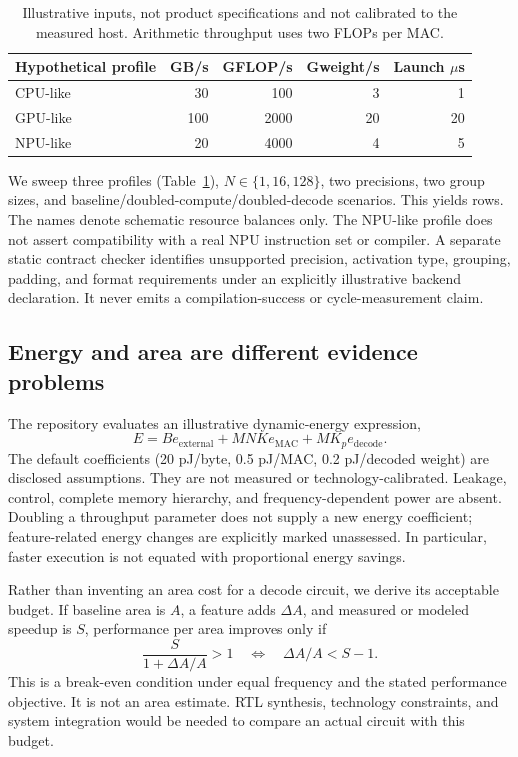 \documentclass[11pt]{article}
\begin{document}
\begin{table}[t]
\centering
\begin{tabular}{lrrrr}
\toprule
Hypothetical profile & GB/s & GFLOP/s & Gweight/s & Launch $\mu$s\\
\midrule
CPU-like &30&100&3&1\\
GPU-like &100&2000&20&20\\
NPU-like &20&4000&4&5\\
\bottomrule
\end{tabular}
\caption{Illustrative inputs, not product specifications and not calibrated to the
measured host. Arithmetic throughput uses two FLOPs per MAC.}
\label{tab:profiles}
\end{table}

We sweep three profiles (Table~\ref{tab:profiles}), $N\in\{1,16,128\}$, two
precisions, two group sizes, and baseline/doubled-compute/doubled-decode
scenarios. This yields \ScenarioCount{} rows. The names denote schematic resource
balances only. The NPU-like profile does not assert compatibility with a real NPU
instruction set or compiler. A separate static contract checker identifies
unsupported precision, activation type, grouping, padding, and format requirements
under an explicitly illustrative backend declaration. It never emits a
compilation-success or cycle-measurement claim.

\subsection{Energy and area are different evidence problems}
The repository evaluates an illustrative dynamic-energy expression,
\begin{equation}
E=B e_{\mathrm{external}}+MNK e_{\mathrm{MAC}}+MK_p e_{\mathrm{decode}}.
\end{equation}
The default coefficients (20 pJ/byte, 0.5 pJ/MAC, 0.2 pJ/decoded weight) are
disclosed assumptions. They are not measured or technology-calibrated.
Leakage, control, complete memory hierarchy, and frequency-dependent power are
absent. Doubling a throughput parameter does not supply a new energy coefficient;
feature-related energy changes are explicitly marked unassessed. In particular,
faster execution is not equated with proportional energy savings.

Rather than inventing an area cost for a decode circuit, we derive its acceptable
budget. If baseline area is $A$, a feature adds $\Delta A$, and measured or modeled
speedup is $S$, performance per area improves only if
\begin{equation}
\frac{S}{1+\Delta A/A}>1\quad\Longleftrightarrow\quad
\Delta A/A<S-1.
\label{eq:area}
\end{equation}
This is a break-even condition under equal frequency and the stated performance
objective. It is not an area estimate. RTL synthesis, technology constraints, and
system integration would be needed to compare an actual circuit with this budget.
\end{document}
